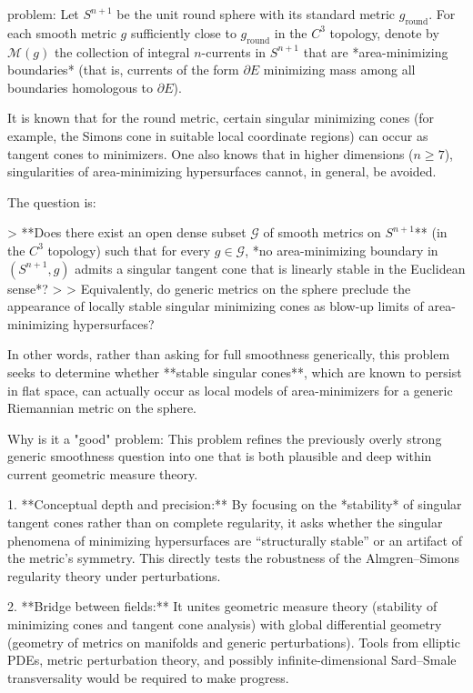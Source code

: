 problem:  
Let \(S^{n+1}\) be the unit round sphere with its standard metric \(g_{\mathrm{round}}\). For each smooth metric \(g\) sufficiently close to \(g_{\mathrm{round}}\) in the \(C^{3}\) topology, denote by \(\mathcal{M}(g)\) the collection of integral \(n\)-currents in \(S^{n+1}\) that are *area-minimizing boundaries* (that is, currents of the form \(\partial E\) minimizing mass among all boundaries homologous to \(\partial E\)).  

It is known that for the round metric, certain singular minimizing cones (for example, the Simons cone in suitable local coordinate regions) can occur as tangent cones to minimizers. One also knows that in higher dimensions (\(n \ge 7\)), singularities of area-minimizing hypersurfaces cannot, in general, be avoided.  

The question is:  

> **Does there exist an open dense subset \(\mathcal{G}\) of smooth metrics on \(S^{n+1}\)** (in the \(C^{3}\) topology) such that for every \(g \in \mathcal{G}\), *no area-minimizing boundary in \((S^{n+1}, g)\) admits a singular tangent cone that is linearly stable in the Euclidean sense*?  
>   
> Equivalently, do generic metrics on the sphere preclude the appearance of locally stable singular minimizing cones as blow-up limits of area-minimizing hypersurfaces?

In other words, rather than asking for full smoothness generically, this problem seeks to determine whether **stable singular cones**, which are known to persist in flat space, can actually occur as local models of area-minimizers for a generic Riemannian metric on the sphere.  

Why is it a "good" problem:  
This problem refines the previously overly strong generic smoothness question into one that is both plausible and deep within current geometric measure theory.

1. **Conceptual depth and precision:**  
   By focusing on the *stability* of singular tangent cones rather than on complete regularity, it asks whether the singular phenomena of minimizing hypersurfaces are “structurally stable” or an artifact of the metric’s symmetry. This directly tests the robustness of the Almgren–Simons regularity theory under perturbations.

2. **Bridge between fields:**  
   It unites geometric measure theory (stability of minimizing cones and tangent cone analysis) with global differential geometry (geometry of metrics on manifolds and generic perturbations). Tools from elliptic PDEs, metric perturbation theory, and possibly infinite-dimensional Sard–Smale transversality would be required to make progress.

